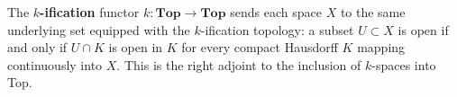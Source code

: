 The \textbf{$k$-ification} functor $k: \mathbf{Top} \rightarrow \mathbf{Top}$ sends each space $X$ to the same underlying set equipped with the $k$-ification topology: a subset $U \subset X$ is open if and only if $U \cap K$ is open in $K$ for every compact Hausdorff $K$ mapping continuously into $X$. This is the right adjoint to the inclusion of $k$-spaces into Top.